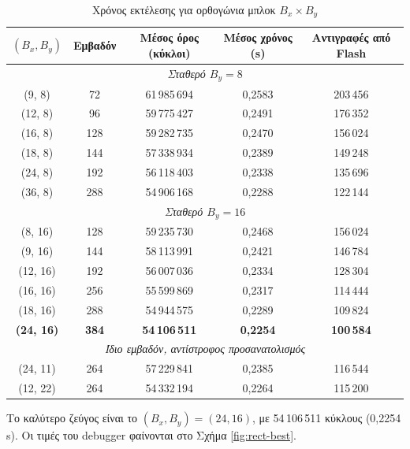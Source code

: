 \documentclass[12pt]{article}
\begin{document}
\begin{table}[H]
    \centering
    \begin{tabular}{ccccc}
        \toprule
        $(B_x, B_y)$ & Εμβαδόν & Μέσος όρος (κύκλοι) & Μέσος χρόνος (s) & Αντιγραφές από Flash \\
        \midrule
        \multicolumn{5}{c}{\textit{Σταθερό $B_y = 8$}} \\
        \midrule
        (9, 8)   & 72  & 61\,985\,694 & 0,2583 & 203\,456 \\
        (12, 8)  & 96  & 59\,775\,427 & 0,2491 & 176\,352 \\
        (16, 8)  & 128 & 59\,282\,735 & 0,2470 & 156\,024 \\
        (18, 8)  & 144 & 57\,338\,934 & 0,2389 & 149\,248 \\
        (24, 8)  & 192 & 56\,118\,403 & 0,2338 & 135\,696 \\
        (36, 8)  & 288 & 54\,906\,168 & 0,2288 & 122\,144 \\
        \midrule
        \multicolumn{5}{c}{\textit{Σταθερό $B_y = 16$}} \\
        \midrule
        (8, 16)  & 128 & 59\,235\,730 & 0,2468 & 156\,024 \\
        (9, 16)  & 144 & 58\,113\,991 & 0,2421 & 146\,784 \\
        (12, 16) & 192 & 56\,007\,036 & 0,2334 & 128\,304 \\
        (16, 16) & 256 & 55\,599\,869 & 0,2317 & 114\,444 \\
        (18, 16) & 288 & 54\,944\,575 & 0,2289 & 109\,824 \\
        \textbf{(24, 16)} & \textbf{384} & \textbf{54\,106\,511} & \textbf{0,2254} & \textbf{100\,584} \\
        \midrule
        \multicolumn{5}{c}{\textit{Ίδιο εμβαδόν, αντίστροφος προσανατολισμός}} \\
        \midrule
        (24, 11) & 264 & 57\,229\,841 & 0,2385 & 116\,544 \\
        (12, 22) & 264 & 54\,332\,194 & 0,2264 & 115\,200 \\
        \bottomrule
    \end{tabular}
    \caption{Χρόνος εκτέλεσης για ορθογώνια μπλοκ $B_x \times B_y$}
    \label{tab:rect-block}
\end{table}

Το καλύτερο ζεύγος είναι το $(B_x, B_y) = (24, 16)$, με 54\,106\,511 κύκλους (0,2254 s). Οι τιμές του debugger φαίνονται στο Σχήμα \ref{fig:rect-best}.
\end{document}
